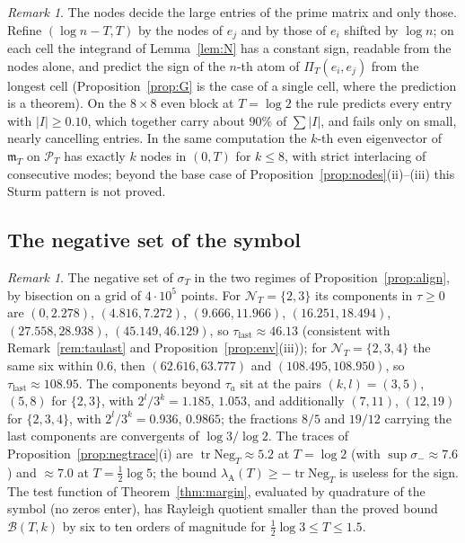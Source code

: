 \documentclass[11pt]{amsart}
\theoremstyle{definition}
\theoremstyle{remark}
\newtheorem{remark}[theorem]{Remark}
\newcommand{\PT}{\mathcal P_T}
\newcommand{\lamA}{\lambda_{\mathrm A}(T)}
\newcommand{\sT}{\sigma_T}
\newcommand{\NT}{\mathcal N_T}
\newcommand{\PiT}{\Pi_T}
\newcommand{\mT}{\mathfrak m_T}
\begin{document}
\begin{remark}\label{rem:signrule}
The nodes decide the large entries of the prime matrix and only those. Refine $(\log n-T,T)$ by the nodes of $e_j$
and by those of $e_i$ shifted by $\log n$; on each cell the integrand of Lemma~\ref{lem:N} has a constant sign, readable
from the nodes alone, and predict the sign of the $n$-th atom of $\PiT(e_i,e_j)$ from the longest cell
(Proposition~\ref{prop:G} is the case of a single cell, where the prediction is a theorem). On the $8\times8$ even block
at $T=\log2$ the rule predicts every entry with $|I|\ge0.10$, which together carry about $90\%$ of $\sum|I|$, and fails
only on small, nearly cancelling entries. In the same computation the $k$-th even eigenvector of $\mT$ on $\PT$ has
exactly $k$ nodes in $(0,T)$ for $k\le8$, with strict interlacing of consecutive modes; beyond the base case of
Proposition~\ref{prop:nodes}(ii)--(iii) this Sturm pattern is not proved.
\end{remark}

\subsection{The negative set of the symbol}
\begin{remark}\label{rem:bandtable}
The negative set of $\sT$ in the two regimes of Proposition~\ref{prop:align}, by bisection on a grid of $4\cdot10^5$
points. For $\NT=\{2,3\}$ its components in $\tau\ge0$ are $(0,2.278)$, $(4.816,7.272)$, $(9.666,11.966)$,
$(16.251,18.494)$, $(27.558,28.938)$, $(45.149,46.129)$, so $\tau_{\mathrm{last}}\approx46.13$ (consistent with
Remark~\ref{rem:taulast} and Proposition~\ref{prop:env}(iii)); for $\NT=\{2,3,4\}$ the same six within $0.6$, then
$(62.616,63.777)$ and $(108.495,108.950)$, so $\tau_{\mathrm{last}}\approx108.95$. The components beyond $\tau_a$ sit at the pairs
$(k,l)=(3,5)$, $(5,8)$ for $\{2,3\}$, with $2^l/3^k=1.185$, $1.053$, and additionally $(7,11)$, $(12,19)$ for $\{2,3,4\}$,
with $2^l/3^k=0.936$, $0.9865$; the fractions $8/5$ and $19/12$ carrying the last components are convergents of
$\log3/\log2$. The traces of Proposition~\ref{prop:negtrace}(i) are $\operatorname{tr}\mathrm{Neg}_T\approx5.2$ at $T=\log2$ (with
$\sup\sigma_-\approx7.6$) and $\approx7.0$ at $T=\frac12\log5$; the bound $\lamA\ge-\operatorname{tr}\mathrm{Neg}_T$ is useless for the sign.
The test function of Theorem~\ref{thm:margin}, evaluated by quadrature of the symbol (no zeros enter), has Rayleigh
quotient smaller than the proved bound $\mathcal B(T,k)$ by six to ten orders of magnitude for
$\frac12\log3\le T\le1.5$.
\end{remark}
\end{document}
